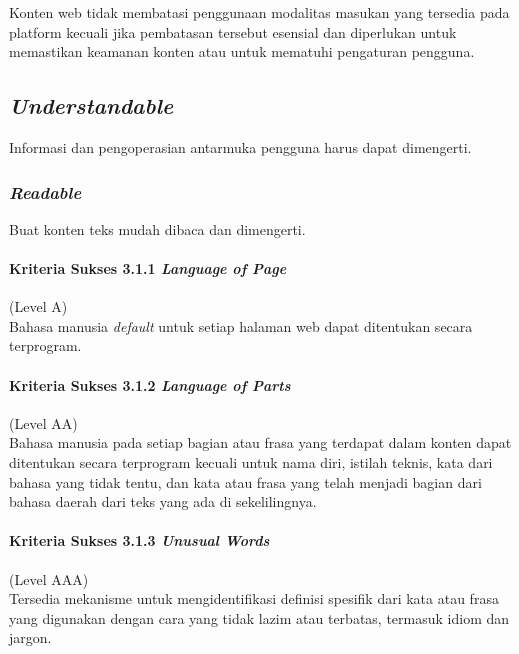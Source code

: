 Konten web tidak membatasi penggunaan modalitas masukan yang tersedia pada platform kecuali jika pembatasan tersebut esensial dan diperlukan untuk memastikan keamanan konten atau untuk mematuhi pengaturan pengguna.


\subsection{\textit{Understandable}}
\label{sec:understandable}
Informasi dan pengoperasian antarmuka pengguna harus dapat dimengerti.

\subsubsection{\textit{Readable}}
\label{sec:readable}
Buat konten teks mudah dibaca dan dimengerti.

\paragraph{Kriteria Sukses 3.1.1 \textit{Language of Page}}
\label{sec:kriteria_sukses_3.1.1}
(Level A)\\

Bahasa manusia \textit{default} untuk setiap halaman web dapat ditentukan secara terprogram.

\paragraph{Kriteria Sukses 3.1.2 \textit{Language of Parts}}
\label{sec:kriteria_sukses_3.1.2}
(Level AA)\\

Bahasa manusia pada setiap bagian atau frasa yang terdapat dalam konten dapat ditentukan secara terprogram kecuali untuk nama diri, istilah teknis, kata dari bahasa yang tidak tentu, dan kata atau frasa yang telah menjadi bagian dari bahasa daerah dari teks yang ada di sekelilingnya.

\paragraph{Kriteria Sukses 3.1.3 \textit{Unusual Words}}
\label{sec:kriteria_sukses_3.1.3}
(Level AAA)\\

Tersedia mekanisme untuk mengidentifikasi definisi spesifik dari kata atau frasa yang digunakan dengan cara yang tidak lazim atau terbatas, termasuk idiom dan jargon.

